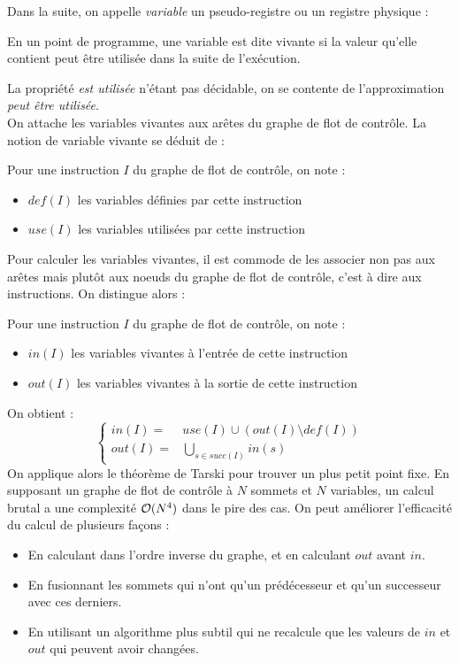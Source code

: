 \documentclass{cours}
\begin{document}
Dans la suite, on appelle \textit{variable} un pseudo-registre ou un registre physique : 
\begin{definition}
    En un point de programme, une variable est dite vivante si la valeur qu'elle contient peut être utilisée dans la suite de l'exécution. 
\end{definition}
La propriété \textit{est utilisée} n'étant pas décidable, on se contente de l'approximation \textit{peut être utilisée}.\\

On attache les variables vivantes aux arêtes du graphe de flot de contrôle. La notion de variable vivante se déduit de : 
\begin{definition}
    Pour une instruction $I$ du graphe de flot de contrôle, on note :
    \begin{itemize}
        \item $def(I)$ les variables définies par cette instruction
        \item $use(I)$ les variables utilisées par cette instruction
    \end{itemize}
\end{definition}

Pour calculer les variables vivantes, il est commode de les associer non pas aux arêtes mais plutôt aux noeuds du graphe de flot de contrôle, c'est à dire aux instructions. On distingue alors : 
\begin{definition}
    Pour une instruction $I$ du graphe de flot de contrôle, on note :
    \begin{itemize}
        \item $in(I)$ les variables vivantes à l'entrée de cette instruction
        \item $out(I)$ les variables vivantes à la sortie de cette instruction
    \end{itemize}
\end{definition}

On obtient : 
\[
    \begin{cases}
        in(I) = & use(I) \cup \left(out(I)\setminus def(I)\right) \\
        out(I) = & \bigcup_{s \in succ(I)} in(s)
    \end{cases}
\]
On applique alors le théorème de Tarski pour trouver un plus petit point fixe. En supposant un graphe de flot de contrôle à $N$ sommets et $N$ variables, un calcul brutal a une complexité $\mathcal{O}(N^{4})$ dans le pire des cas. On peut améliorer l'efficacité du calcul de plusieurs façons : 
\begin{itemize}
    \item En calculant dans l'ordre inverse du graphe, et en calculant $out$ avant $in$.
    \item En fusionnant les sommets qui n'ont qu'un prédécesseur et qu'un successeur avec ces derniers.
    \item En utilisant un algorithme plus subtil qui ne recalcule que les valeurs de $in$ et $out$ qui peuvent avoir changées.
\end{itemize}
\end{document}
